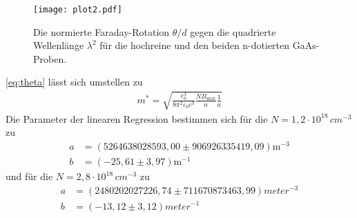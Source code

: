 \begin{figure}[hbt!]
  \label{fig:diff}
  \texttt{[image: plot2.pdf]}
  \caption{Die normierte Faraday-Rotation $\theta/d$ gegen die quadrierte Wellenlänge $\lambda^2$ für die
  hochreine und den beiden n-dotierten GaAs-Proben.}
\end{figure}
\autoref{eq:theta} lässt sich umstellen zu
 \begin{align*}
  m^{*} = \sqrt{\frac{e_0^3}{8\pi^2 \varepsilon_0 c^3} \frac{N B_\text{max}}{n} \frac{1}{a}}
  \end{align*}
Die Parameter der linearen Regression bestimmen sich für die $N=1,2\cdot 10^{18}\,cm^{-3}$ zu
\begin{align*}
  a &= (5264638028593,00 \pm 906926335419,09) \si{\meter}^{-3} \\
  b &= (-25,61 \pm 3,97) \si{\meter}^{-1}
\end{align*}
und für die $N=2,8\cdot 10^{18}\,cm^{-3}$ zu
\begin{align*}
  a &= (2480202027226,74 \pm 711670873463,99) \si{meter}^{-3} \\
  b &= (-13,12 \pm 3,12) \si{meter}^{-1}
\end{align*}